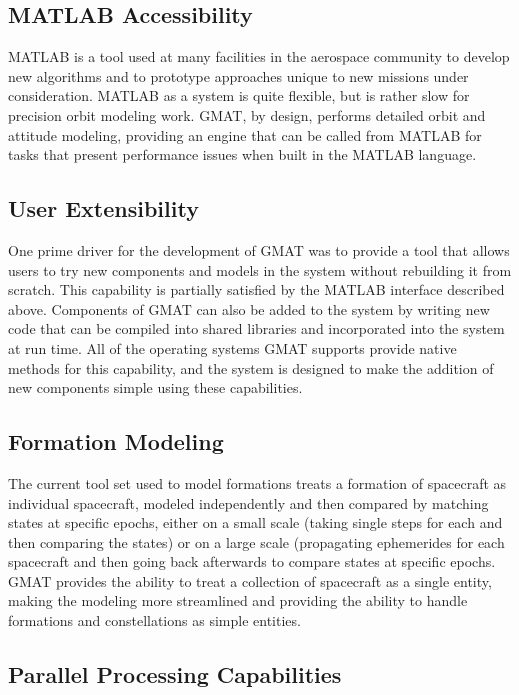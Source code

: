 \subsection{MATLAB Accessibility}

MATLAB is a tool used at many facilities in the aerospace community to develop new algorithms and to
prototype approaches unique to new missions under consideration.  MATLAB as a system is quite
flexible, but is rather slow for precision orbit modeling work.  GMAT, by design, performs detailed
orbit and attitude modeling, providing an engine that can be called from MATLAB for tasks that
present performance issues when built in the MATLAB language.

\subsection{User Extensibility}

One prime driver for the development of GMAT was to provide a tool that allows users to try
new components and models in the system without rebuilding it from scratch.  This capability is
partially satisfied by the MATLAB interface described above.  Components of GMAT can also be added
to the system by writing new code that can be compiled into shared libraries and incorporated into
the system at run time.  All of the operating systems GMAT supports provide native methods for this
capability, and the system is designed to make the addition of new components simple using these
capabilities.

\subsection{Formation Modeling}

The current tool set used to model formations treats a formation of spacecraft as individual
spacecraft, modeled independently and then compared by matching states at specific epochs, either
on a small scale (taking single steps for each and then comparing the states) or on a large scale
(propagating ephemerides for each spacecraft and then going back afterwards to compare states at
specific epochs.  GMAT provides the ability to treat a collection of spacecraft as a single entity,
making the modeling more streamlined and providing the ability to handle formations and
constellations as simple entities.

\subsection{Parallel Processing Capabilities}


